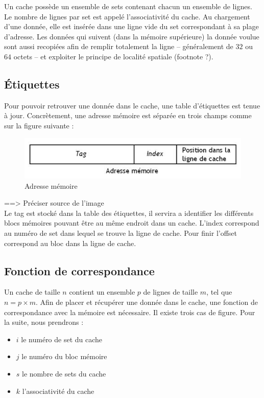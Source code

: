 Un cache possède un ensemble de sets contenant chacun un ensemble de lignes. Le nombre de lignes par set est appelé l'associativité du cache. Au chargement d'une donnée, elle est insérée dans une ligne vide du set correspondant à sa plage d'adresse. Les données qui suivent (dans la mémoire supérieure) la donnée voulue sont aussi recopiées afin de remplir totalement la ligne -- généralement de $32$ ou $64$ octets -- et exploiter le principe de localité spatiale (footnote ?).

\subsection{\'Etiquettes}
Pour pouvoir retrouver une donnée dans le cache, une table d'étiquettes est tenue à jour. Concrètement, une adresse mémoire est séparée en trois champs comme sur la figure suivante : \\

\begin{figure}[!h]
\begin{center}
   \includegraphics[scale=0.50]{images/etiquette.jpeg}
   \caption{\label{img:etiquette} Adresse mémoire}
\end{center}
\end{figure}

==> Préciser source de l'image\\

Le tag est stocké dans la table des étiquettes, il servira a identifier les différents blocs mémoires pouvant être au même endroit dans un cache. L'index correspond au numéro de set dans lequel se trouve la ligne de cache. Pour finir l'offset correspond au bloc dans la ligne de cache.

\subsection{Fonction de correspondance}
Un cache de taille $n$ contient un ensemble $p$ de lignes de taille $m$, tel que $n = p \times m$. Afin de placer et récupérer une donnée dans le cache, une fonction de correspondance avec la mémoire est nécessaire. Il existe trois cas de figure. Pour la suite, nous prendrons : \\
\begin{itemize}
\item $i$ le numéro de set du cache
\item $j$ le numéro du bloc mémoire
\item $s$ le nombre de sets du cache
\item $k$ l'associativité du cache 
\end{itemize}

